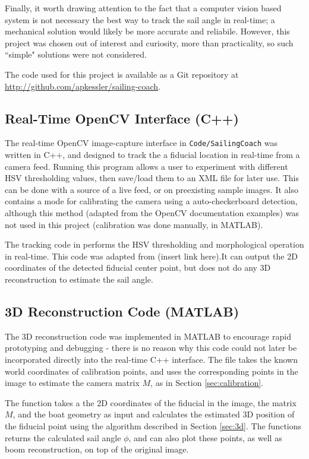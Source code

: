 \documentclass[letterpaper, 10 pt, conference]{ieeeconf}  %
\begin{document}
Finally, it worth drawing attention to the fact that a computer vision based system is not necessary the best way to track the sail angle in real-time; a mechanical solution would likely be more accurate and reliabile. However, this project was chosen out of interest and curiosity, more than practicality, so such ``simple" solutions were not considered. 

{}



\appendix
The code used for this project is available as a Git repository at \url{http://github.com/apkessler/sailing-coach}. 
\subsection{Real-Time OpenCV Interface (C++)}
The real-time OpenCV image-capture interface in \verb=Code/SailingCoach= was written in C++, and designed to track the a fiducial location in real-time from a camera feed. Running this program allows a user to experiment with different HSV thresholding values, then save/load them to an XML file for later use. This can be done with a source of a live feed, or on preexisting sample images. It also contains a mode for calibrating the camera using a auto-checkerboard detection, although this method (adapted from the OpenCV documentation examples) was not used in this project (calibration was done manually, in MATLAB). 

The tracking code in  performs the HSV thresholding and morphological operation in real-time. This code was adapted from (insert link here).It can output the 2D coordinates of the detected fiducial center point, but does not do any 3D reconstruction to estimate the sail angle.

\subsection{3D Reconstruction Code (MATLAB)}
The 3D reconstruction code was implemented in MATLAB to encourage rapid prototyping and debugging - there is no reason why this code could not later be incorporated directly into the real-time C++ interface.
The file  takes the known world coordinates of calibration points, and uses the corresponding points in the image to estimate the camera matrix $M$, as in Section \ref{sec:calibration}.

The function  takes a the 2D coordinates of the fiducial in the image, the matrix $M$, and the boat geometry as input and calculates the estimated 3D position of the fiducial point using the algorithm described in Section \ref{sec:3d}. The functions returns the calculated sail angle $\phi$, and can also plot these points, as well as boom reconstruction, on top of the original image. 
\end{document}

